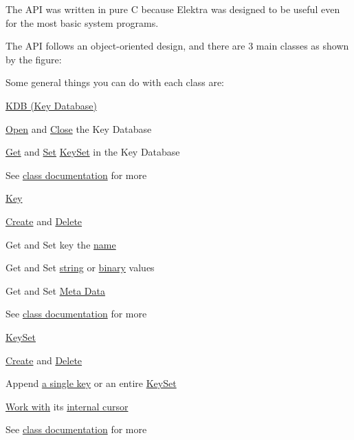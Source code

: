 The A\+P\+I was written in pure C because Elektra was designed to be useful even for the most basic system programs.

The A\+P\+I follows an object-\/oriented design, and there are 3 main classes as shown by the figure\+:

 Some general things you can do with each class are\+:

\hyperlink{group__kdb}{K\+D\+B (Key Database)}


\begin{DoxyItemize}
\item \hyperlink{group__kdb_ga6808defe5870f328dd17910aacbdc6ca}{Open} and \hyperlink{group__kdb_gadb54dc9fda17ee07deb9444df745c96f}{Close} the Key Database
\item \hyperlink{group__kdb_ga28e385fd9cb7ccfe0b2f1ed2f62453a1}{Get} and \hyperlink{group__kdb_ga11436b058408f83d303ca5e996832bcf}{Set} \hyperlink{group__keyset}{Key\+Set} in the Key Database
\item See \hyperlink{group__kdb}{class documentation} for more
\end{DoxyItemize}

\hyperlink{group__key}{Key}
\begin{DoxyItemize}
\item \hyperlink{group__key_gad23c65b44bf48d773759e1f9a4d43b89}{Create} and \hyperlink{group__key_ga3df95bbc2494e3e6703ece5639be5bb1}{Delete}
\item Get and Set key the \hyperlink{group__keyname_ga7699091610e7f3f43d2949514a4b35d9}{name}
\item Get and Set \hyperlink{group__keyvalue_ga622bde1eb0e0c4994728331326340ef2}{string} or \hyperlink{group__keyvalue_gaa50a5358fd328d373a45f395fa1b99e7}{binary} values
\item Get and Set \hyperlink{group__keymeta}{Meta Data}
\item See \hyperlink{group__key}{class documentation} for more
\end{DoxyItemize}

\hyperlink{group__keyset}{Key\+Set}
\begin{DoxyItemize}
\item \hyperlink{group__keyset_ga671e1aaee3ae9dc13b4834a4ddbd2c3c}{Create} and \hyperlink{group__keyset_ga27e5c16473b02a422238c8d970db7ac8}{Delete}
\item Append \hyperlink{group__keyset_gaa5a1d467a4d71041edce68ea7748ce45}{a single key} or an entire \hyperlink{group__keyset_ga21eb9c3a14a604ee3a8bdc779232e7b7}{Key\+Set}
\item \hyperlink{group__keyset_ga317321c9065b5a4b3e33fe1c399bcec9}{Work with} its \hyperlink{group__keyset_ga4287b9416912c5f2ab9c195cb74fb094}{internal cursor}
\item See \hyperlink{group__keyset}{class documentation} for more
\end{DoxyItemize}


